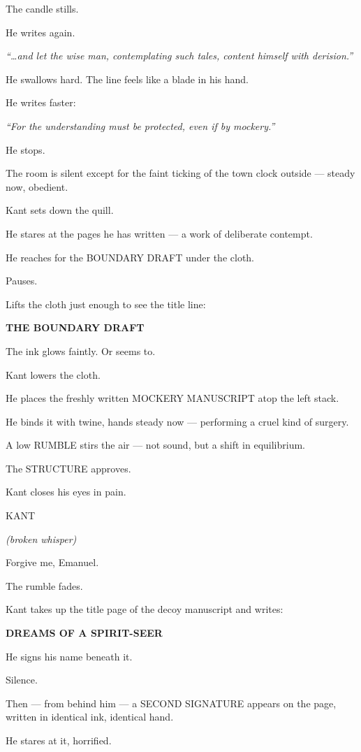 \documentclass[12pt]{article}
\newenvironment{dialogue}[1]{%
  \vspace{0.8\baselineskip}%
  \noindent\hspace*{2.3in}\textsc{#1}\par%
  \noindent\hspace*{1.5in}\begin{minipage}[t]{4.5in}%
}{%
  \end{minipage}\par%
}
\newcommand{\paren}[1]{%
  \noindent\hspace*{1.8in}\textit{(#1)}\par%
}
\begin{document}
The candle stills.

He writes again.

\textit{
“…and let the wise man, contemplating such tales,  
content himself with derision.”}

He swallows hard. The line feels like a blade in his hand.

He writes faster:

\textit{
“For the understanding must be protected,  
even if by mockery.”}

He stops.

The room is silent except for the faint ticking of the town clock
outside — steady now, obedient.

Kant sets down the quill.

He stares at the pages he has written — a work of deliberate contempt.

He reaches for the BOUNDARY DRAFT under the cloth.

Pauses.

Lifts the cloth just enough to see the title line:

\textbf{THE BOUNDARY DRAFT}

The ink glows faintly. Or seems to.

Kant lowers the cloth.

He places the freshly written MOCKERY MANUSCRIPT atop the left stack.

He binds it with twine, hands steady now — performing a cruel kind of
surgery.

A low RUMBLE stirs the air — not sound, but a shift in equilibrium.

The STRUCTURE approves.

Kant closes his eyes in pain.

\begin{dialogue}{KANT}
\paren{broken whisper}
Forgive me, Emanuel.
\end{dialogue}

The rumble fades.

Kant takes up the title page of the decoy manuscript and writes:

\centerline{\textbf{\large DREAMS OF A SPIRIT-SEER}}

He signs his name beneath it.

Silence.

Then — from behind him — a SECOND SIGNATURE appears on the page,
written in identical ink, identical hand.

He stares at it, horrified.
\end{document}
